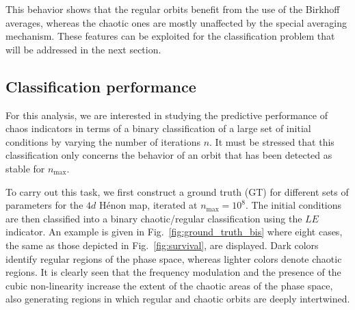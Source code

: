 This behavior shows that the regular orbits benefit from the use of the Birkhoff averages, whereas the chaotic ones are mostly unaffected by the special averaging mechanism. These features can be exploited for the classification problem that will be addressed in the next section.

\subsection{Classification performance}

For this analysis, we are interested in studying the predictive performance of chaos indicators in terms of a binary classification of a large set of initial conditions by varying the number of iterations $n$. It must be stressed that this classification only concerns the behavior of an orbit that has been detected as stable for $n_\mathrm{max}$.

To carry out this task, we first construct a ground truth (GT) for different sets of parameters for the $4d$ Hénon map, iterated at $n_\text{max} = 10^8$. The initial conditions are then classified into a binary chaotic/regular classification using the $LE$ indicator. An example is given in Fig.~\ref{fig:ground_truth_bis} where eight cases, the same as those depicted in Fig.~\ref{fig:survival}, are displayed. Dark colors identify regular regions of the phase space, whereas lighter colors denote chaotic regions. It is clearly seen that the frequency modulation and the presence of the cubic non-linearity increase the extent of the chaotic areas of the phase space, also generating regions in which regular and chaotic orbits are deeply intertwined.  

